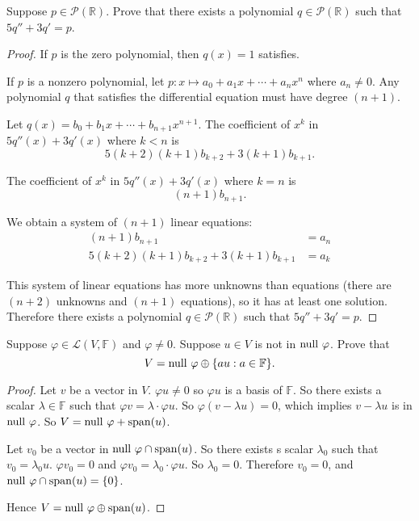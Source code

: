 \begin{exercise}
    Suppose $p \in \mathcal{P}(\mathbb{R})$. Prove that there exists a polynomial $q \in \mathcal{P}(\mathbb{R})$ such that $5q'' + 3q' = p$.
\end{exercise}

\begin{proof}
    If $p$ is the zero polynomial, then $q(x) = 1$ satisfies.

    If $p$ is a nonzero polynomial, let $p: x\mapsto a_{0} + a_{1}x + \cdots + a_{n}x^{n}$ where $a_{n}\ne 0$. Any polynomial $q$ that satisfies the differential equation must have degree $(n+1)$.

    Let $q(x) = b_{0} + b_{1}x + \cdots + b_{n+1}x^{n+1}$. The coefficient of $x^{k}$ in $5q''(x) + 3q'(x)$ where $k < n$ is
    \[
        5(k+2)(k+1)b_{k+2} + 3(k+1)b_{k+1}.
    \]

    The coefficient of $x^{k}$ in $5q''(x) + 3q'(x)$ where $k = n$ is
    \[
        (n+1)b_{n+1}.
    \]

    We obtain a system of $(n+1)$ linear equations:
    \begin{align*}
        (n+1)b_{n+1}                       & = a_{n} \\
        5(k+2)(k+1)b_{k+2} + 3(k+1)b_{k+1} & = a_{k}
    \end{align*}

    This system of linear equations has more unknowns than equations (there are $(n+2)$ unknowns and $(n+1)$ equations), so it has at least one solution. Therefore there exists a polynomial $q\in\mathcal{P}(\mathbb{R})$ such that $5q'' + 3q' = p$.
\end{proof}
\newpage

\begin{exercise}\label{chapter3:sectionB:exercise30}
    Suppose $\varphi \in \mathcal{L}(V, \mathbb{F})$ and $\varphi \ne 0$. Suppose $u \in V$ is not in $\operatorname{null}\,{\varphi}$. Prove that
    \[
        V = \operatorname{null}\,{\varphi} \oplus \{ au : a\in\mathbb{F} \}.
    \]
\end{exercise}

\begin{proof}
    Let $v$ be a vector in $V$. $\varphi u\ne 0$ so $\varphi u$ is a basis of $\mathbb{F}$. So there exists a scalar $\lambda\in\mathbb{F}$ such that $\varphi v = \lambda\cdot \varphi u$. So $\varphi(v - \lambda u) = 0$, which implies $v - \lambda u$ is in $\operatorname{null}\,{\varphi}$. So $V = \operatorname{null}\,{\varphi} + \operatorname{span}(u)$.

    Let $v_{0}$ be a vector in $\operatorname{null}\,{\varphi}\cap\operatorname{span}(u)$. So there exists s scalar $\lambda_{0}$ such that $v_{0} = \lambda_{0}u$. $\varphi v_{0} = 0$ and $\varphi v_{0} = \lambda_{0}\cdot \varphi u$. So $\lambda_{0} = 0$. Therefore $v_{0} = 0$, and $\operatorname{null}\,{\varphi}\cap\operatorname{span}(u) = \{0\}$.

    Hence $V = \operatorname{null}\,{\varphi} \oplus \operatorname{span}(u)$.
\end{proof}
\newpage

